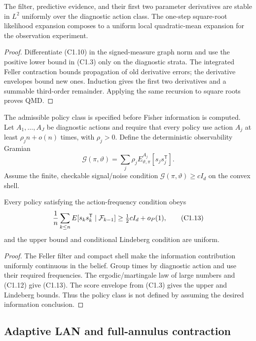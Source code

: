 \begin{lemma}
\label{lem:r27-c1-qmd}
The filter, predictive evidence, and their first two parameter derivatives
are stable in $L^2$ uniformly over the diagnostic action class.  The
one-step square-root likelihood expansion composes to a uniform local
quadratic-mean expansion for the observation experiment.
\end{lemma}

\begin{proof}
Differentiate (C1.10) in the signed-measure graph norm and use the positive
lower bound in (C1.3) only on the diagnostic strata.  The integrated Feller
contraction bounds propagation of old derivative errors; the derivative
envelopes bound new ones.  Induction gives the first two derivatives and a
summable third-order remainder.  Applying the same recursion to square roots
proves QMD.
\end{proof}

The admissible policy class is specified before Fisher information is
computed.  Let $A_1,\ldots,A_J$ be diagnostic actions and require that every
policy use action $A_j$ at least $\rho_jn+o(n)$ times, with
$\rho_j>0$.  Define the deterministic observability Gramian
\[
 \mathcal G(\pi,\vartheta)
 =\sum_j\rho_j
 E_{\vartheta,\pi}^{A_j}[s_js_j^\mathsf T].               \tag{C1.12}
\]
Assume the finite, checkable signal/noise condition
$\mathcal G(\pi,\vartheta)\ge cI_d$ on the convex shell.

\begin{theorem}
\label{thm:r27-c1-info}
Every policy satisfying the action-frequency condition obeys
\[
 {1\over n}\sum_{k\le n}
 E[s_ks_k^\mathsf T\mid\mathcal F_{k-1}]
 \ge\tfrac12cI_d+o_P(1),                                  \tag{C1.13}
\]
and the upper bound and conditional Lindeberg condition are uniform.
\end{theorem}

\begin{proof}
The Feller filter and compact shell make the information contribution
uniformly continuous in the belief.  Group times by diagnostic action and use
their required frequencies.  The ergodic/martingale law of large numbers and
(C1.12) give (C1.13).  The score envelope from (C1.3) gives the upper and
Lindeberg bounds.  Thus the policy class is not defined by assuming the
desired information conclusion.
\end{proof}

\subsection{Adaptive LAN and full-annulus contraction}

